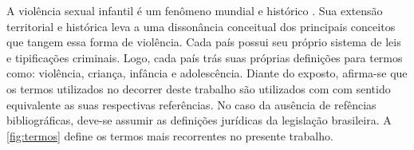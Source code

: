

A violência sexual infantil é um fenômeno mundial e histórico \cite{pinto2017avaliaccao}. Sua extensão territorial e histórica leva a uma dissonância conceitual dos principais conceitos que tangem essa forma de violência. Cada país possui seu próprio sistema de leis e tipificações criminais. Logo, cada país trás suas próprias definições para termos como: violência, criança, infância e adolescência. Diante do exposto, afirma-se que os termos utilizados no decorrer deste trabalho são utilizados com com sentido equivalente as suas respectivas referências. No caso da ausência de refências bibliográficas, deve-se assumir as definições jurídicas da legislação brasileira. A \autoref{fig:termos} define os termos mais recorrentes no presente trabalho.

